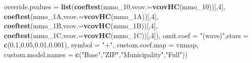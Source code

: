 \documentclass[
]{article}
\newenvironment{Shaded}{\begin{snugshade}}{\end{snugshade}}
\newcommand{\DataTypeTok}[1]{\textcolor[rgb]{0.13,0.29,0.53}{#1}}
\newcommand{\DecValTok}[1]{\textcolor[rgb]{0.00,0.00,0.81}{#1}}
\newcommand{\FloatTok}[1]{\textcolor[rgb]{0.00,0.00,0.81}{#1}}
\newcommand{\KeywordTok}[1]{\textcolor[rgb]{0.13,0.29,0.53}{\textbf{#1}}}
\newcommand{\NormalTok}[1]{#1}
\newcommand{\StringTok}[1]{\textcolor[rgb]{0.31,0.60,0.02}{#1}}
\begin{document}
\begin{Shaded}
\begin{Highlighting}[]
          \DataTypeTok{override.pvalues =} \KeywordTok{list}\NormalTok{(}\KeywordTok{coeftest}\NormalTok{(mmo_}\DecValTok{10}\NormalTok{,}\DataTypeTok{vcov.=}\KeywordTok{vcovHC}\NormalTok{(mmo_}\DecValTok{10}\NormalTok{))[,}\DecValTok{4}\NormalTok{],}
                                  \KeywordTok{coeftest}\NormalTok{(mmo_1A,}\DataTypeTok{vcov.=}\KeywordTok{vcovHC}\NormalTok{(mmo_1A))[,}\DecValTok{4}\NormalTok{],}
                                  \KeywordTok{coeftest}\NormalTok{(mmo_1B,}\DataTypeTok{vcov.=}\KeywordTok{vcovHC}\NormalTok{(mmo_1B))[,}\DecValTok{4}\NormalTok{],}
                                  \KeywordTok{coeftest}\NormalTok{(mmo_1C,}\DataTypeTok{vcov.=}\KeywordTok{vcovHC}\NormalTok{(mmo_1C))[,}\DecValTok{4}\NormalTok{]),}
          \DataTypeTok{omit.coef =} \StringTok{"(wave)"}\NormalTok{,}\DataTypeTok{stars =} \KeywordTok{c}\NormalTok{(}\FloatTok{0.1}\NormalTok{,}\FloatTok{0.05}\NormalTok{,}\FloatTok{0.01}\NormalTok{,}\FloatTok{0.001}\NormalTok{), }\DataTypeTok{symbol =} \StringTok{"+"}\NormalTok{,}
          \DataTypeTok{custom.coef.map =}\NormalTok{ vnmap, }
          \DataTypeTok{custom.model.names =} \KeywordTok{c}\NormalTok{(}\StringTok{"Base"}\NormalTok{,}\StringTok{"ZIP"}\NormalTok{,}\StringTok{"Municipality"}\NormalTok{,}\StringTok{"Full"}\NormalTok{))}
\end{Highlighting}
\end{Shaded}
\end{document}
